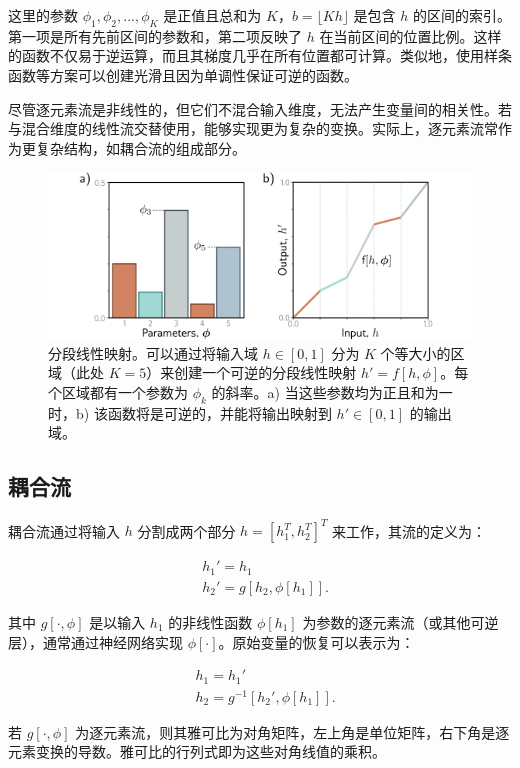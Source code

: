 这里的参数 \(\phi_1, \phi_2, ..., \phi_K\) 是正值且总和为 \(K\)，\(b = \lfloor Kh \rfloor\) 是包含 \(h\) 的区间的索引。第一项是所有先前区间的参数和，第二项反映了 \(h\) 在当前区间的位置比例。这样的函数不仅易于逆运算，而且其梯度几乎在所有位置都可计算。类似地，使用样条函数等方案可以创建光滑且因为单调性保证可逆的函数。

尽管逐元素流是非线性的，但它们不混合输入维度，无法产生变量间的相关性。若与混合维度的线性流交替使用，能够实现更为复杂的变换。实际上，逐元素流常作为更复杂结构，如耦合流的组成部分。

\begin{figure}[ht!]
\centering
\includegraphics[width=0.7\linewidth]{png/chapter16/FlowPiecewiseLinear.png}
\caption{分段线性映射。可以通过将输入域 \( h \in [0, 1] \) 分为 \( K \) 个等大小的区域（此处 \( K = 5 \)）来创建一个可逆的分段线性映射 \( h' = f[h, \phi] \)。每个区域都有一个参数为 \( \phi_k \) 的斜率。a) 当这些参数均为正且和为一时，b) 该函数将是可逆的，并能将输出映射到 \( h' \in [0, 1] \) 的输出域。}
\end{figure}


\subsection{耦合流}
耦合流通过将输入 \(h\) 分割成两个部分 \(h = [h_1^T, h_2^T]^T\) 来工作，其流的定义为：

\begin{align}
&h_1' = h_1 \\
&h_2' = g[h_2, \phi[h_1]]. 
\end{align} 


其中 \(g[\cdot, \phi]\) 是以输入 \(h_1\) 的非线性函数 \(\phi[h_1]\) 为参数的逐元素流（或其他可逆层），通常通过神经网络实现 \(\phi[\cdot]\)。原始变量的恢复可以表示为：


\begin{align}
&h_1 = h_1' \\
&h_2 = g^{-1}[h_2', \phi[h_1]]. 
\end{align} 


若 \(g[\cdot, \phi]\) 为逐元素流，则其雅可比为对角矩阵，左上角是单位矩阵，右下角是逐元素变换的导数。雅可比的行列式即为这些对角线值的乘积。


